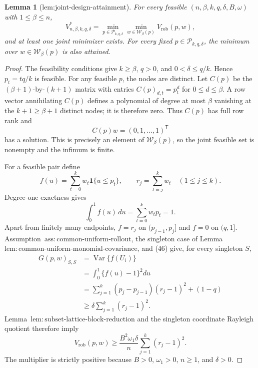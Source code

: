 \documentclass{article}
\newtheorem{lemma}{Lemma}
\begin{document}
\begin{lemma}[lem:joint-design-attainment]\label{lem:joint-design-attainment}
For every feasible \((n,\beta,k,q,\delta,B,\omega)\) with \(1\le\beta\le n\),
\[
V^*_{n,\beta,k,q,\delta}
=\min_{p\in\mathcal P_{k,q,\delta}}
\min_{w\in\mathcal W_\beta(p)}V_{\mathrm{rob}}(p,w),
\]
and at least one joint minimizer exists.  For every fixed \(p\in\mathcal P_{k,q,\delta}\), the minimum over \(w\in\mathcal W_\beta(p)\) is also attained.
\end{lemma}
\begin{proof}
The feasibility conditions give \(k\ge\beta\), \(q>0\), and \(0<\delta\le q/k\).  Hence \(p_t=tq/k\) is feasible.  For any feasible \(p\), the nodes are distinct.  Let \(C(p)\) be the \((\beta+1)\)-by-\((k+1)\) matrix with entries \(C(p)_{d,t}=p_t^d\) for \(0\le d\le\beta\).  A row vector annihilating \(C(p)\) defines a polynomial of degree at most \(\beta\) vanishing at the \(k+1\ge\beta+1\) distinct nodes; it is therefore zero.  Thus \(C(p)\) has full row rank and
\[
C(p)w=(0,1,\ldots,1)^{\mathsf T}
\]
has a solution.  This is precisely an element of \(\mathcal W_\beta(p)\), so the joint feasible set is nonempty and the infimum is finite.

For a feasible pair define
\[
f(u)=\sum_{t=0}^kw_t\mathbf 1\{u\le p_t\},
\qquad
r_j=\sum_{t=j}^kw_t\quad(1\le j\le k).
\]
Degree-one exactness gives
\[
\int_0^1f(u)\,du=\sum_{t=0}^kw_tp_t=1.
\tag{46}
\]
Apart from finitely many endpoints, \(f=r_j\) on \((p_{j-1},p_j]\) and \(f=0\) on \((q,1]\).  Assumption~\(\mathrm{ass{:}common\text{-}uniform\text{-}rollout}\), the singleton case of Lemma~\(\mathrm{lem{:}common\text{-}uniform\text{-}monomial\text{-}covariance}\), and (46) give, for every singleton \(S\),
\[
\begin{aligned}
G(p,w)_{S,S}
&=\operatorname{Var}\{f(U_i)\}\\
&=\int_0^1\{f(u)-1\}^2du\\
&=\sum_{j=1}^k(p_j-p_{j-1})(r_j-1)^2+(1-q)\\
&\ge\delta\sum_{j=1}^k(r_j-1)^2.
\end{aligned}
\tag{47}
\]
Lemma~\(\mathrm{lem{:}subset\text{-}lattice\text{-}block\text{-}reduction}\) and the singleton coordinate Rayleigh quotient therefore imply
\[
V_{\mathrm{rob}}(p,w)
\ge\frac{B^2\omega_1\delta}{n}
\sum_{j=1}^k(r_j-1)^2.
\tag{48}
\]
The multiplier is strictly positive because \(B>0\), \(\omega_1>0\), \(n\ge1\), and \(\delta>0\).


\end{proof}
\end{document}
